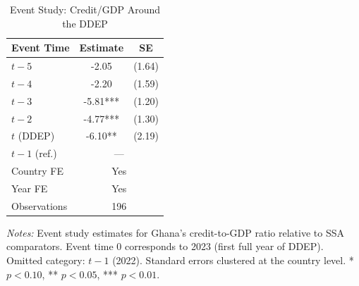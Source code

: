 \begin{table}[t]
\centering
\caption{Event Study: Credit/GDP Around the DDEP}
\label{tab:event_study}
\begin{tabular}{lcc}
\toprule
Event Time & Estimate & SE \\
\midrule
$t-5$ & -2.05 & (1.64) \\
$t-4$ & -2.20 & (1.59) \\
$t-3$ & -5.81*** & (1.20) \\
$t-2$ & -4.77*** & (1.30) \\
$t$ (DDEP) & -6.10** & (2.19) \\
$t-1$ (ref.) & \multicolumn{2}{c}{---} \\
\midrule
Country FE & \multicolumn{2}{c}{Yes} \\
Year FE & \multicolumn{2}{c}{Yes} \\
Observations & \multicolumn{2}{c}{196} \\
\bottomrule
\end{tabular}
\begin{tablenotes}[flushleft]
\small
\item \textit{Notes:} Event study estimates for Ghana's credit-to-GDP ratio relative to SSA comparators. Event time 0 corresponds to 2023 (first full year of DDEP). Omitted category: $t-1$ (2022). Standard errors clustered at the country level. * $p < 0.10$, ** $p < 0.05$, *** $p < 0.01$.
\end{tablenotes}
\end{table}
